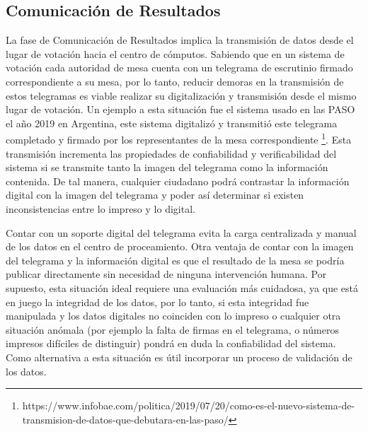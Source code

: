 \subsection{Comunicación de Resultados} 
La fase de Comunicación de Resultados implica la transmisión de datos desde el lugar de votación hacia el centro de cómputos. Sabiendo que en un sistema de votación cada autoridad de mesa cuenta con un telegrama de escrutinio firmado correspondiente a su mesa, por lo tanto, reducir demoras en la transmisión de estos telegramas es viable realizar su digitalización y transmisión desde el mismo lugar de votación. Un ejemplo a esta situación fue el sistema usado en las PASO el año 2019 en Argentina, este sistema digitalizó y transmitió este telegrama completado y firmado por los representantes de la mesa correspondiente \footnote{https://www.infobae.com/politica/2019/07/20/como-es-el-nuevo-sistema-de-transmision-de-datos-que-debutara-en-las-paso/}.
Esta transmisión incrementa las propiedades de confiabilidad y verificabilidad del sistema si se transmite tanto la imagen del telegrama como la información contenida. De tal manera, cualquier ciudadano podrá contrastar la información digital con la imagen del telegrama y poder así determinar si existen inconsistencias entre lo impreso y lo digital.

Contar con un soporte digital del telegrama evita la carga centralizada y manual de los datos en el centro de proceamiento. Otra ventaja de contar con la imagen del telegrama y la información digital es que el resultado de la mesa se podría publicar directamente sin necesidad de ninguna intervención humana. Por supuesto, esta situación ideal requiere una evaluación más cuidadosa, ya que está en juego la integridad de los datos, por lo tanto, si esta integridad fue manipulada y los datos digitales no coinciden con lo impreso o cualquier otra situación anómala (por ejemplo la falta de firmas en el telegrama, o números impresos difíciles de distinguir) pondrá en duda la confiabilidad del sistema. Como alternativa a esta situación es útil incorporar un proceso de validación de los datos.


